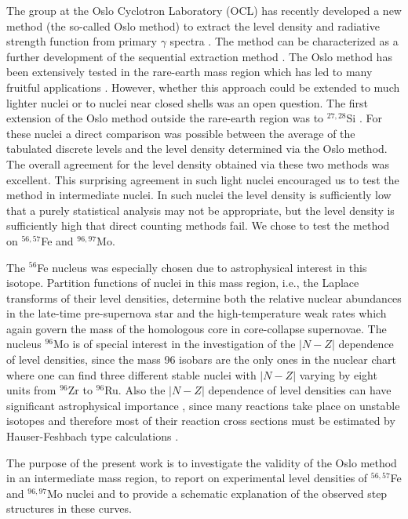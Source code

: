 \begin{multicols}{2}

The group at the Oslo Cyclotron Laboratory (OCL) has recently developed a new 
method (the so-called Oslo method) to extract the level density and radiative 
strength function from primary $\gamma$ spectra \cite{SB00}. The method can be
characterized as a further development of the sequential extraction method 
\cite{BB70,BE73}. The Oslo method has been extensively tested in the rare-earth
mass region which has led to many fruitful applications 
\cite{SB01,MG01,VG01,SG02}. However, whether this approach could be extended to
much lighter nuclei or to nuclei near closed shells was an open question. The 
first extension of the Oslo method outside the rare-earth region was to 
$^{27,28}$Si \cite{GM02}. For these nuclei a direct comparison was possible 
between the average of the tabulated discrete levels and the level density 
determined via the Oslo method. The overall agreement for the level density 
obtained via these two methods was excellent. This surprising agreement in such
light nuclei encouraged us to test the method in intermediate nuclei. In such 
nuclei the level density is sufficiently low that a purely statistical analysis
may not be appropriate, but the level density is sufficiently high that direct
counting methods fail. We chose to test the method on $^{56,57}$Fe and 
$^{96,97}$Mo.

The $^{56}$Fe nucleus was especially chosen due to astrophysical interest in 
this isotope. Partition functions of nuclei in this mass region, i.e., the 
Laplace transforms of their level densities, determine both the relative 
nuclear abundances in the late-time pre-supernova star \cite{BB79} and the 
high-temperature weak rates \cite{FF82} which again govern the mass of the 
homologous core in core-collapse supernovae. The nucleus $^{96}$Mo is of 
special interest in the investigation of the $|N-Z|$ dependence of level 
densities, since the mass 96 isobars are the only ones in the nuclear chart 
where one can find three different stable nuclei with $|N-Z|$ varying by eight 
units from $^{96}$Zr to $^{96}$Ru. Also the $|N-Z|$ dependence of level 
densities can have significant astrophysical importance \cite{AG01}, since many
reactions take place on unstable isotopes and therefore most of their reaction 
cross sections must be estimated by Hauser-Feshbach type calculations 
\cite{HF52,AA99}.

The purpose of the present work is to investigate the validity of the Oslo 
method in an intermediate mass region, to report on experimental level 
densities of $^{56,57}$Fe and $^{96,97}$Mo nuclei and to provide a schematic 
explanation of the observed step structures in these curves.


\end{multicols}
